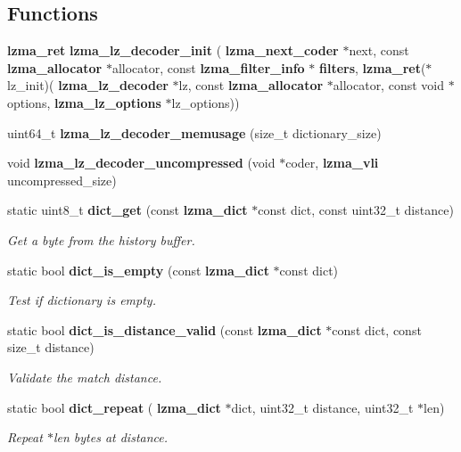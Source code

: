 \subsection*{Functions}
\begin{DoxyCompactItemize}
\item 
\mbox{\label{lz__decoder_8h_a12e91e9d8a15d26186dd608af7a98339}} 
\textbf{ lzma\+\_\+ret} {\bfseries lzma\+\_\+lz\+\_\+decoder\+\_\+init} (\textbf{ lzma\+\_\+next\+\_\+coder} $\ast$next, const \textbf{ lzma\+\_\+allocator} $\ast$allocator, const \textbf{ lzma\+\_\+filter\+\_\+info} $\ast$\textbf{ filters}, \textbf{ lzma\+\_\+ret}($\ast$lz\+\_\+init)(\textbf{ lzma\+\_\+lz\+\_\+decoder} $\ast$lz, const \textbf{ lzma\+\_\+allocator} $\ast$allocator, const void $\ast$options, \textbf{ lzma\+\_\+lz\+\_\+options} $\ast$lz\+\_\+options))
\item 
\mbox{\label{lz__decoder_8h_aa715866ca37ce5fd726c391b0da5b882}} 
uint64\+\_\+t {\bfseries lzma\+\_\+lz\+\_\+decoder\+\_\+memusage} (size\+\_\+t dictionary\+\_\+size)
\item 
\mbox{\label{lz__decoder_8h_ad33f4cbab851dcfaec8498f6f54ebd84}} 
void {\bfseries lzma\+\_\+lz\+\_\+decoder\+\_\+uncompressed} (void $\ast$coder, \textbf{ lzma\+\_\+vli} uncompressed\+\_\+size)
\item 
static uint8\+\_\+t \textbf{ dict\+\_\+get} (const \textbf{ lzma\+\_\+dict} $\ast$const dict, const uint32\+\_\+t distance)
\begin{DoxyCompactList}\small\item\em Get a byte from the history buffer. \end{DoxyCompactList}\item 
static bool \textbf{ dict\+\_\+is\+\_\+empty} (const \textbf{ lzma\+\_\+dict} $\ast$const dict)
\begin{DoxyCompactList}\small\item\em Test if dictionary is empty. \end{DoxyCompactList}\item 
static bool \textbf{ dict\+\_\+is\+\_\+distance\+\_\+valid} (const \textbf{ lzma\+\_\+dict} $\ast$const dict, const size\+\_\+t distance)
\begin{DoxyCompactList}\small\item\em Validate the match distance. \end{DoxyCompactList}\item 
static bool \textbf{ dict\+\_\+repeat} (\textbf{ lzma\+\_\+dict} $\ast$dict, uint32\+\_\+t distance, uint32\+\_\+t $\ast$len)
\begin{DoxyCompactList}\small\item\em Repeat $\ast$len bytes at distance. \end{DoxyCompactList}\item 

\end{DoxyCompactItemize}
